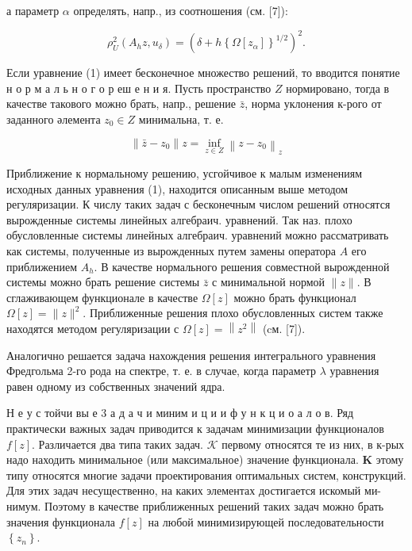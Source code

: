 \documentclass[10pt]{article}
\begin{document}
а параметр $\alpha$ определять, напр., из соотношения (см. [7]):



\[

\rho_{U}^{2}\left(A_{h} z, u_{\delta}\right)=\left(\delta+h\left\{\Omega\left[z_{\alpha}\right]\right\}^{1 / 2}\right)^{2} .

\]



Если уравнение (1) имеет бесконечное множество решений, то вводится понятие н о р м а л ь н о г о р еш е н и я. Пусть пространство $Z$ нормировано, тогда в качестве такового можно брать, напр., решение $\bar{z}$, норма уклонения к-рого от заданного әлемента $z_{0} \in Z$ минимальна, т. е.



\[

\left\|\bar{z}-z_{0}\right\| z=\inf _{z \in Z}\left\|z-z_{0}\right\|_{z}

\]



Приближение к нормальному решению, усгойчивое к малым изменениям исходных данных уравнения (1), находится описанным выше методом регуляризации. К числу таких задач с бесконечным числом решений относятся вырожденные системы линейных алгебраич. уравнений. Так наз. плохо обусловленные системы линейных алгебраич. уравнений можно рассматривать как системы, полученные из вырожденных путем замены оператора $A$ его приближением $A_{h}$. В качестве нормального решения совместной вырожденной системы можно брать решение системы $\bar{z}$ с минимальной нормой $\|z\|$. В сглаживающем функционале в качестве $\Omega[z]$ можно брать функционал $\Omega[z]=\|z\|^{2}$. Приближенные решения плохо обусловленных систем также находятся методом регуляризации с $\Omega[z]=\left\|z^{2}\right\|$ (cм. [7]).



Аналогично решается задача нахождения решения интегрального уравнения Фредгольма 2-го рода на спектре, т. е. в случае, когда параметр $\lambda$ уравнения равен одному из собственных значений ядра.



Н е у с тойчи вы е 3 а д а ч и миним и ц и и ф у н к ц и о а л о в. Ряд практически важных задач приводится к задачам минимизации функционалов $f[z]$. Различается два типа таких задач. $\mathcal{K}$ первому относятся те из них, в к-рых надо находить минимальное (или максимальное) значение функционала. $\mathbf{K}$ этому типу относятся многие задачи проектирования оптимальных систем, конструкций. Для этих задач несущественно, на каких элементах достигается искомый ми- нимум. Поэтому в качестве приближенных решений таких задач можно брать значения функционала $f[z]$ на любой минимизирующей последовательности $\left\{z_{n}\right\}$.
\end{document}
